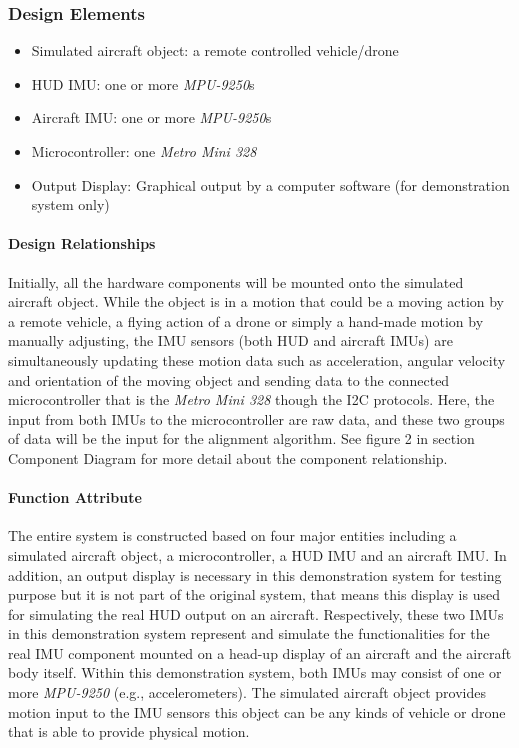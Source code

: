 		\subsubsection{Design Elements}
			\begin{itemize}
				\item Simulated aircraft object: a remote controlled vehicle/drone
				\item HUD IMU: one or more \textit{MPU-9250}s
				\item Aircraft IMU: one or more \textit{MPU-9250}s
				\item Microcontroller: one \textit{Metro Mini 328}
				\item Output Display: Graphical output by a computer software (for demonstration system only)
			\end{itemize}

			\paragraph{Design Relationships}
			Initially, all the hardware components will be mounted onto the simulated aircraft object. While the object is in a motion that could be a moving action by a remote vehicle, a flying action of a drone or simply a hand-made motion by manually adjusting, the IMU sensors (both HUD and aircraft IMUs) are simultaneously updating these motion data such as acceleration, angular velocity and orientation of the moving object and sending data to the connected microcontroller that is the \textit{Metro Mini 328} though the I2C protocols. Here, the input from both IMUs to the microcontroller are raw data, and these two groups of data will be the input for the alignment algorithm. See figure 2 in section Component Diagram for more detail about the component relationship.

			\paragraph{Function Attribute}
			The entire system is constructed based on four major entities including a simulated aircraft object, a microcontroller, a HUD IMU and an aircraft IMU. In addition, an output display is necessary in this demonstration system for testing purpose but it is not part of the original system, that means this display is used for simulating the real HUD output on an aircraft. Respectively, these two IMUs in this demonstration system represent and simulate the functionalities for the real IMU component mounted on a head-up display of an aircraft and the aircraft body itself. Within this demonstration system, both IMUs may consist of one or more \textit{MPU-9250} (e.g., accelerometers). The simulated aircraft object provides motion input to the IMU sensors this object can be any kinds of vehicle or drone that is able to provide physical motion.

